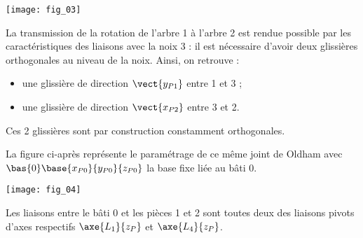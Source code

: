 \begin{center}%
\texttt{[image: fig\_03]}
\end{center}

La transmission de la rotation de l’arbre 1 à l’arbre 2 est rendue possible par les caractéristiques des liaisons avec la noix 3 : il est nécessaire d’avoir deux glissières orthogonales au niveau de la noix. Ainsi, on retrouve :
\begin{itemize}
\item une glissière de direction $\vect{y_{P1}}$ entre 1 et 3 ;
\item une glissière de direction $\vect{x_{P2}}$ entre 3 et 2.
\end{itemize}

Ces 2 glissières sont par construction constamment orthogonales.

La figure ci-après représente le paramétrage de ce même joint de Oldham avec $\bas{0}\base{x_{P0}}{y_{P0}}{z_{P0}}$ la base fixe liée au bâti 0.




\begin{center}%
\texttt{[image: fig\_04]}
\end{center}





Les liaisons entre le bâti 0 et les pièces 1 et 2 sont toutes deux des liaisons pivots d’axes respectifs
$\axe{L_1}{z_P}$ et $\axe{L_4}{z_P}$.




